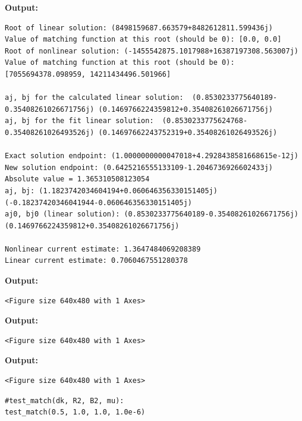 \documentclass{article}
\begin{document}
\textbf{Output:}\begin{verbatim}
Root of linear solution: (8498159687.663579+8482612811.599436j)
Value of matching function at this root (should be 0): [0.0, 0.0]
Root of nonlinear solution: (-1455542875.1017988+16387197308.563007j)
Value of matching function at this root (should be 0): [7055694378.098959, 14211434496.501966]

aj, bj for the calculated linear solution:  (0.8530233775640189-0.35408261026671756j) (0.1469766224359812+0.35408261026671756j)
aj, bj for the fit linear solution:  (0.8530233775624768-0.35408261026493526j) (0.14697662243752319+0.35408261026493526j)

Exact solution endpoint: (1.0000000000047018+4.2928438581668615e-12j)
New solution endpoint: (0.6425216555133109-1.2046736926602433j) Absolute value = 1.365310508123054
aj, bj: (1.1823742034604194+0.060646356330151405j) (-0.18237420346041944-0.060646356330151405j)
aj0, bj0 (linear solution): (0.8530233775640189-0.35408261026671756j) (0.1469766224359812+0.35408261026671756j)

Nonlinear current estimate: 1.3647484069208389
Linear current estimate: 0.7060467551280378

\end{verbatim}

\textbf{Output:}\begin{verbatim}
<Figure size 640x480 with 1 Axes>
\end{verbatim}

\textbf{Output:}\begin{verbatim}
<Figure size 640x480 with 1 Axes>
\end{verbatim}

\textbf{Output:}\begin{verbatim}
<Figure size 640x480 with 1 Axes>
\end{verbatim}

\begin{lstlisting}
#test_match(dk, R2, B2, mu):
test_match(0.5, 1.0, 1.0, 1.0e-6)\end{lstlisting}
\end{document}

